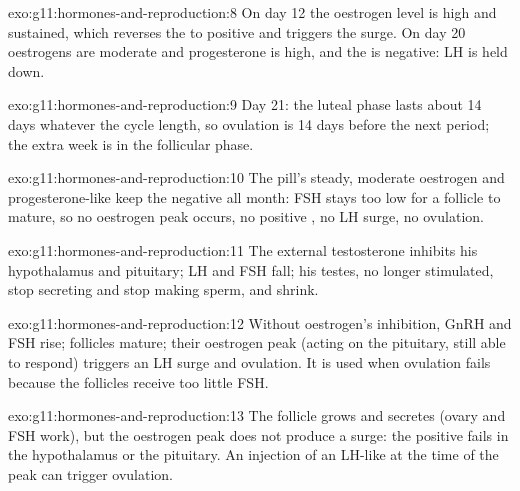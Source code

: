 \begin{solution}{exo:g11:hormones-and-reproduction:8}
On day 12 the oestrogen level is high and sustained, which reverses
the  to positive and triggers the surge. On day 20 oestrogens
are moderate and progesterone is high, and the  is negative:
LH is held down.
\end{solution}

\begin{solution}{exo:g11:hormones-and-reproduction:9}
Day 21: the luteal phase lasts about 14 days whatever the cycle
length, so ovulation is 14 days before the next period; the extra
week is in the follicular phase.
\end{solution}

\begin{solution}{exo:g11:hormones-and-reproduction:10}
The pill's steady, moderate oestrogen and progesterone-like 
keep the  negative all month: FSH stays too low for a
follicle to mature, so no oestrogen peak occurs, no positive ,
no LH surge, no ovulation.
\end{solution}

\begin{solution}{exo:g11:hormones-and-reproduction:11}
The external testosterone inhibits his hypothalamus and pituitary;
LH and FSH fall; his testes, no longer stimulated, stop secreting and
stop making sperm, and shrink.
\end{solution}

\begin{solution}{exo:g11:hormones-and-reproduction:12}
Without oestrogen's inhibition, GnRH and FSH rise; follicles mature;
their oestrogen peak (acting on the pituitary, still able to respond)
triggers an LH surge and ovulation. It is used when ovulation fails
because the follicles receive too little FSH.
\end{solution}

\begin{solution}{exo:g11:hormones-and-reproduction:13}
The follicle grows and secretes (ovary and FSH work), but the
oestrogen peak does not produce a surge: the positive  fails
in the hypothalamus or the pituitary. An injection of an LH-like
 at the time of the peak can trigger ovulation.
\end{solution}

